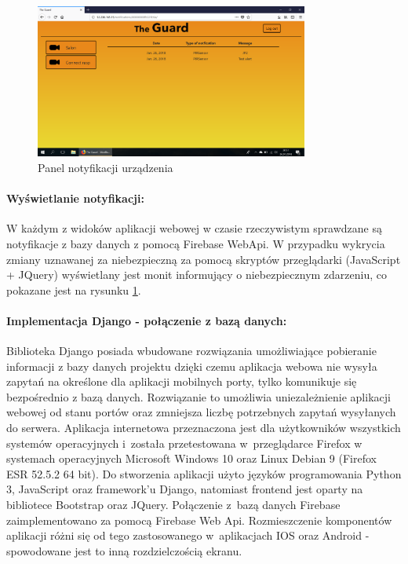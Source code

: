 \begin{figure}[ht]
	\centering
	\includegraphics[width=9cm]{web_screenshots/rasp_notifications.png}
	\caption{Panel notyfikacji urządzenia}
	\label{web_rasp_notifications}
\end{figure}
\paragraph{Wyświetlanie notyfikacji:} W każdym z widoków aplikacji webowej w czasie rzeczywistym sprawdzane są notyfikacje z bazy danych z pomocą Firebase WebApi. W przypadku wykrycia zmiany uznawanej za niebezpieczną za pomocą skryptów przeglądarki (JavaScript + JQuery) wyświetlany jest monit informujący o niebezpiecznym zdarzeniu, co pokazane jest na rysunku \ref{web_rasp_notifications}.  

\paragraph{Implementacja Django - połączenie z bazą danych:}
Biblioteka Django posiada wbudowane rozwiązania umożliwiające pobieranie informacji z bazy danych projektu dzięki czemu aplikacja webowa nie wysyła zapytań na określone dla aplikacji mobilnych porty, tylko komunikuje się bezpośrednio z bazą danych. Rozwiązanie to umożliwia uniezależnienie aplikacji webowej od stanu portów oraz zmniejsza liczbę potrzebnych zapytań wysyłanych do serwera.
Aplikacja internetowa przeznaczona jest dla użytkowników wszystkich systemów operacyjnych i~została przetestowana w~przeglądarce Firefox w systemach operacyjnych Microsoft Windows 10 oraz Linux Debian 9 (Firefox ESR 52.5.2 64 bit). Do stworzenia aplikacji użyto języków programowania Python 3, JavaScript oraz framework'u Django, natomiast frontend jest oparty na bibliotece Bootstrap oraz JQuery. Połączenie z~bazą danych Firebase zaimplementowano za pomocą Firebase Web Api. Rozmieszczenie komponentów aplikacji różni się od tego zastosowanego w~aplikacjach IOS oraz Android - spowodowane jest to inną rozdzielczością ekranu. 

